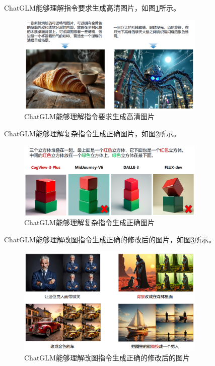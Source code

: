 ChatGLM能够理解指令要求生成高清图片，如图\ref{fig:chatglm4}所示。

\begin{figure}[H]
	\centering
	\includegraphics[width=0.8\textwidth]{figures/chapter1/fig6.png}
	\caption{ChatGLM能够理解指令要求生成高清图片}
	\label{fig:chatglm4}
\end{figure}

ChatGLM能够理解复杂指令生成正确图片，如图\ref{fig:chatglm5}所示。

\begin{figure}[H]
	\centering
	\includegraphics[width=0.8\textwidth]{figures/chapter1/fig7.png}
	\caption{ChatGLM能够理解复杂指令生成正确图片}
	\label{fig:chatglm5}
\end{figure}

ChatGLM能够理解改图指令生成正确的修改后的图片，如图\ref{fig:chatglm6}所示。

\begin{figure}[H]
	\centering
	\includegraphics[width=0.8\textwidth]{figures/chapter1/fig8.png}
	\caption{ChatGLM能够理解改图指令生成正确的修改后的图片}
	\label{fig:chatglm6}
\end{figure}

